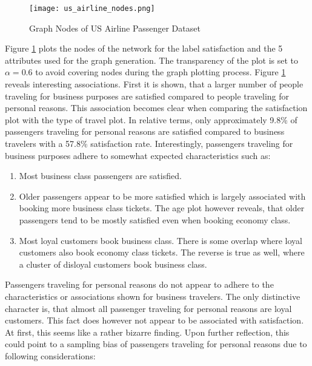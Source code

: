   \begin{figure}[h]
	  \centering
	  \texttt{[image: us\_airline\_nodes.png]}
	  \caption{Graph Nodes of US Airline Passenger Dataset}
      \label{fig:us_airline_nodes}
  \end{figure}

  \noindent Figure \ref{fig:us_airline_nodes} plots the nodes of the network
  for the label satisfaction and the 5 attributes used for the graph
  generation. The transparency of the plot is set to $\alpha = 0.6$ to avoid 
  covering nodes during the graph plotting process. Figure
  \ref{fig:us_airline_nodes} reveals interesting associations. First it is
  shown, that a larger number of people traveling for business purposes are 
  satisfied compared to people traveling for personal reasons. This association
  becomes clear when comparing the satisfaction plot with the type of travel
  plot. In relative terms, only approximately 9.8\% of passengers traveling for 
  personal reasons are satisfied compared to business travelers with a 57.8\% 
  satisfaction rate. Interestingly, passengers traveling for business purposes
  adhere to somewhat expected characteristics such as:

  \begin{enumerate}
    \item Most business class passengers are satisfied. 
    \item Older passengers appear to be more satisfied which is largely
      associated with booking more business class tickets. The age plot however 
      reveals, that older passengers tend to be mostly satisfied even when 
      booking economy class.
    \item Most loyal customers book business class. There is some overlap where 
      loyal customers also book economy class tickets. The reverse is true as 
      well, where a cluster of disloyal customers book business class. 
  \end{enumerate}
  
  \noindent Passengers traveling for personal reasons do not appear to adhere
  to the characteristics or associations shown for business travelers. The only
  distinctive character is, that almost all passenger traveling for personal
  reasons are loyal customers. This fact does however not appear to be
  associated with satisfaction. At first, this seems like a rather bizarre 
  finding. Upon further reflection, this could point to a sampling bias of 
  passengers traveling for personal reasons due to following considerations:


